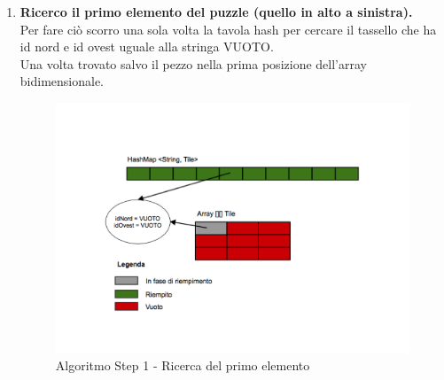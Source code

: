 	\begin{enumerate}
		\item \textbf{Ricerco il primo elemento del puzzle (quello in alto a sinistra).} \\
Per fare ciò scorro una sola volta la tavola hash per cercare il tassello che ha id nord e id ovest uguale alla stringa VUOTO. \\
Una volta trovato salvo il pezzo nella prima posizione dell'array bidimensionale.
		\begin{figure}[htbp]
			\centering
			\includegraphics[width=15cm]{img/algpuzzle_step1.pdf}
			\caption{Algoritmo Step 1 - Ricerca del primo elemento}
			\label{Algoritmo Step 1 - Ricerca del primo elemento}
		\end{figure}
		

\end{enumerate}
